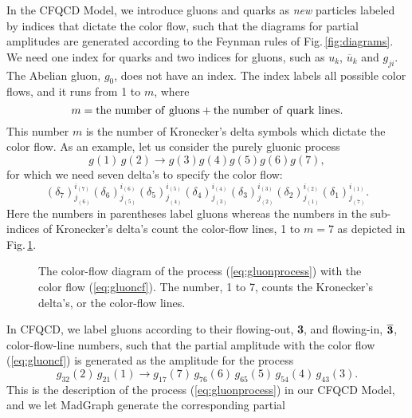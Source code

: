 In the CFQCD Model, we introduce gluons and quarks as {\it new}
particles labeled by indices that dictate the color flow, such that the
diagrams for partial amplitudes are generated according to the Feynman rules of
Fig.\,\ref{fig:diagrams}. We need one index for quarks and two indices for gluons, such as $u_k$,
$\overline{u}_k$ and $g_{ji}$. The Abelian gluon, $g_0$, does not
have an index.
 The index labels all possible color flows, and it
 runs from 1 to $m$, where
\begin{equation}
  m = {\rm the\,\, number\,\, of\,\, gluons} + {\rm the\,\, number\,\,
  of\,\, quark\,\, lines}.
\label{eq:m}
\end{equation}
This number $m$ is the number of Kronecker's delta symbols which dictate the color flow.
As an example, let us consider the purely gluonic process
\begin{equation}
g(1)\,g(2)\rightarrow g(3)g(4)g(5)g(6)g(7),
\label{eq:gluonprocess}
\end{equation}
for which we need seven delta's to specify the color flow:
\begin{equation}
(\delta_7)^{i_{(7)}}_{j_{(6)}}(\delta_6)^{i_{(6)}}_{j_{(5)}}
(\delta_5)^{i_{(5)}}_{j_{(4)}}(\delta_4)^{i_{(4)}}_{j_{(3)}}(\delta_3)^{i_{(3)}}_{j_{(2)}}
(\delta_2)^{i_{(2)}}_{j_{(1)}}(\delta_1)^{i_{(1)}}_{j_{(7)}}.
\label{eq:gluoncf}
\end{equation}
Here the numbers in parentheses label gluons
whereas the numbers in the sub-indices of Kronecker's delta's count the color-flow lines, 1 to $m=7$ as depicted in
 Fig.\,\ref{fig:cfgluon}.
\begin{figure}
\centering
{}
\caption{The color-flow diagram of the process (\ref{eq:gluonprocess})
 with the color flow (\ref{eq:gluoncf}). The number, 1 to 7, counts the
 Kronecker's delta's, or the color-flow lines.}
\label{fig:cfgluon}
\end{figure}
 In CFQCD, we label
 gluons according to their flowing-out, {\bf 3}, and flowing-in,
 $\overline{{\bf 3}}$,
 color-flow-line numbers, such that the partial amplitude
 with the color flow (\ref{eq:gluoncf}) is generated as the
 amplitude for the process
\begin{equation}
g_{32}(2)\,g_{21}(1)\rightarrow
 g_{17}(7)\,g_{76}(6)\,g_{65}(5)\,g_{54}(4)\,g_{43}(3).
 \label{eq:process0}
\end{equation}
This is the description of the process (\ref{eq:gluonprocess}) in our
CFQCD Model, and we let MadGraph generate the corresponding partial
